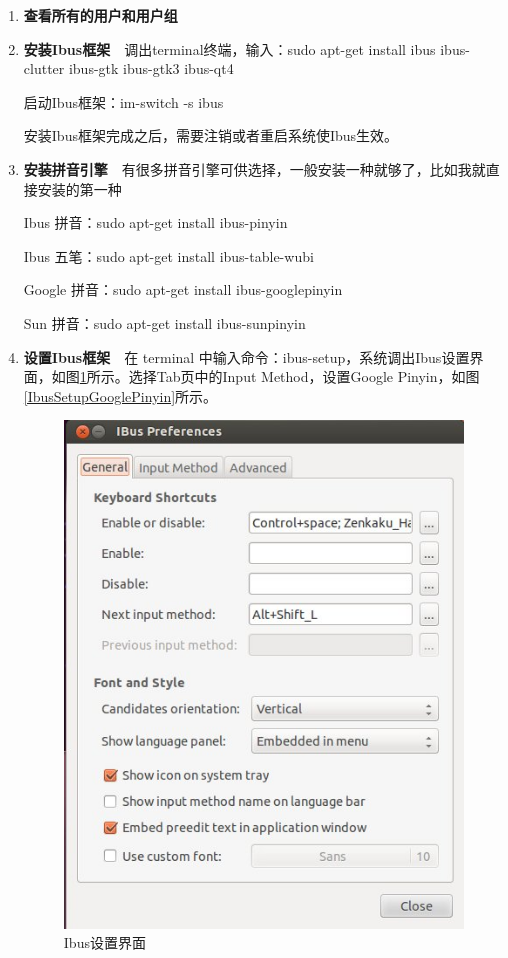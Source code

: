 \documentclass[paper=a4,fontsize=11pt]{article}
\begin{document}
	\begin{enumerate}
		\setcounter{enumi}{0}
		\item{\textbf{查看所有的用户和用户组}}
		\item{\textbf{安装Ibus框架}}~~调出terminal终端，输入：sudo apt-get install ibus ibus-clutter ibus-gtk ibus-gtk3 ibus-qt4
		
		启动Ibus框架：im-switch -s ibus
		
		安装Ibus框架完成之后，需要注销或者重启系统使Ibus生效。
		\item{\textbf{安装拼音引擎}}~~有很多拼音引擎可供选择，一般安装一种就够了，比如我就直接安装的第一种\newline
		
		Ibus 拼音：sudo apt-get install ibus-pinyin\newline
		
		Ibus 五笔：sudo apt-get install ibus-table-wubi\newline
		
		Google 拼音：sudo apt-get install ibus-googlepinyin\newline
				
		Sun 拼音：sudo apt-get install ibus-sunpinyin
				
		\item{\textbf{设置Ibus框架}}~~在 terminal 中输入命令：ibus-setup，系统调出Ibus设置界面，如图\ref{IbusSetup}所示。选择Tab页中的Input Method，设置Google Pinyin，如图\ref{IbusSetupGooglePinyin}所示。
		
		\begin{figure}[htbp]
			\centering
			\includegraphics[scale=0.7]{IbusSetup.jpeg}
			\caption{Ibus设置界面}
			\label{IbusSetup}
		\end{figure}
		

\end{enumerate}
\end{document}
